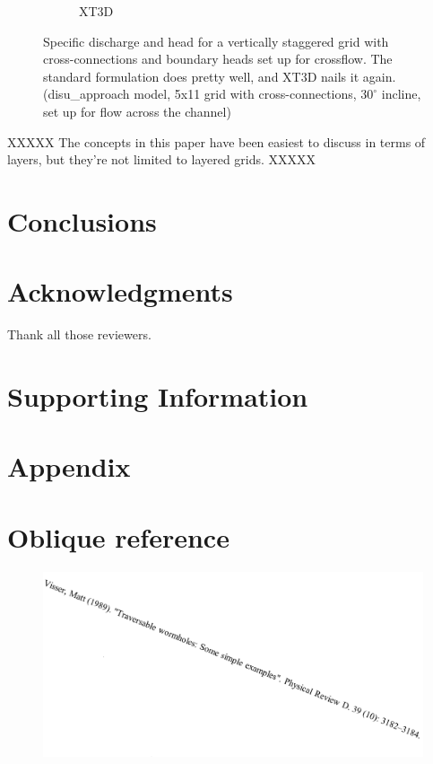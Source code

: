 \documentclass{article}
\begin{document}
\begin{figure}[H]
\begin{subfigure}{0.4\textwidth}
	\caption{XT3D}
	\label{fig:disu-x-cc-cf-head}
\end{subfigure}
\caption{Specific discharge and head for a vertically staggered grid with cross-connections and boundary heads set up for crossflow. The standard formulation does pretty well, and XT3D nails it again. (disu\_approach model, 5x11 grid with cross-connections, $30^{\circ}$ incline, set up for flow across the channel)}
\label{fig:figures}
\end{figure}

XXXXX The concepts in this paper have been easiest to discuss in terms of layers, but they're not limited to layered grids. XXXXX

\section{Conclusions}

\section{Acknowledgments}
Thank all those reviewers.

\section{Supporting Information}

\section{Appendix}



\section{Oblique reference}

\begin{figure}[H]
	\includegraphics[scale=0.5]{../figures/oblique_reference.png}
\end{figure}
\end{document}
